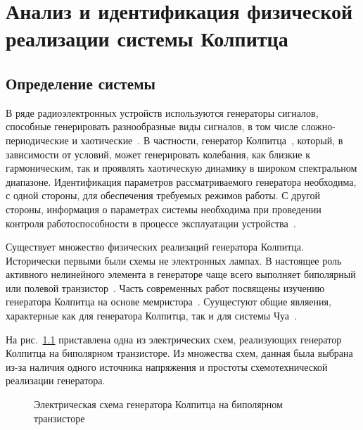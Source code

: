 \chapter{Анализ и идентификация физической реализации системы Колпитца}
\label{atu:ch:colpreal}


\section{Определение системы} %
\label{atu:s:colp_task}

В ряде радиоэлектронных устройств используются
генераторы сигналов, способные генерировать разнообразные виды  сигналов, в том числе
сложно-периодические и хаотические~\cite{dmitriev_gen_chaos}.
В частности, генератор  Колпитца~\cite{kennedy_chaos_colpitts,atu_asau21,Kennedy_Colpitts_predicting}, который, в
зависимости от условий,   может
генерировать  колебания,  как  близкие  к  гармоническим,  так  и  проявлять
хаотическую  динамику  в  широком  спектральном   диапазоне.   Идентификация
параметров рассматриваемого генератора  необходима,  с  одной  стороны,  для
обеспечения  требуемых  режимов  работы.  С  другой  стороны,  информация  о
параметрах системы необходима при проведении  контроля  работоспособности  в
процессе эксплуатации устройства~\cite{atu_apir2013}.

Существует множество физических реализаций генератора Колпитца.
Исторически первыми были схемы не электронных лампах. %
В настоящее роль активного нелинейного элемента в генераторе
чаще всего выполняет биполярный или полевой транзистор~\cite{doi:10.1063/1.4705999}. %
Часть современных работ посвящены изучению генератора Колпитца
на основе мемристора~\cite{DBLP:journals/corr/WangWQ15}.
Суущестуют общие являения, характерные как для генератора Колпитца, так и для системы Чуа~\cite{Kennedy_Colpitts_Chua}.

На рис.~\ref{atu:f:colp_schem} приставлена одна из электрических схем,
реализующих генератор Колпитца на биполярном транзисторе.
Из множества схем, данная была выбрана из-за наличия
одного источника напряжения и простоты схемотехнической реализации генератора.


\begin{figure}[htb!]
\begin{center}

\end{center}
\caption{Электрическая схема генератора Колпитца на биполярном транзисторе}
\label{atu:f:colp_schem}
\end{figure}

